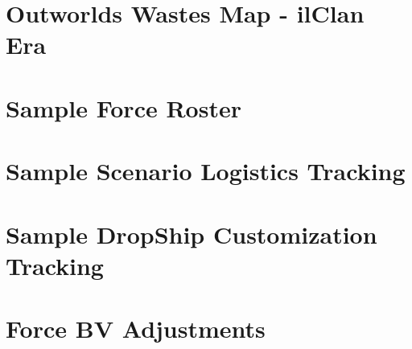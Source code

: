 \documentclass{article}
\begin{document}
\section{Outworlds Wastes Map - ilClan Era}



\newpage

\section{Sample Force Roster}



\newpage

\section{Sample Scenario Logistics Tracking}



\newpage

\section{Sample DropShip Customization Tracking}



\newpage

\section{Force BV Adjustments}
\label{sec:force_bv_adjustments}


\end{document}
